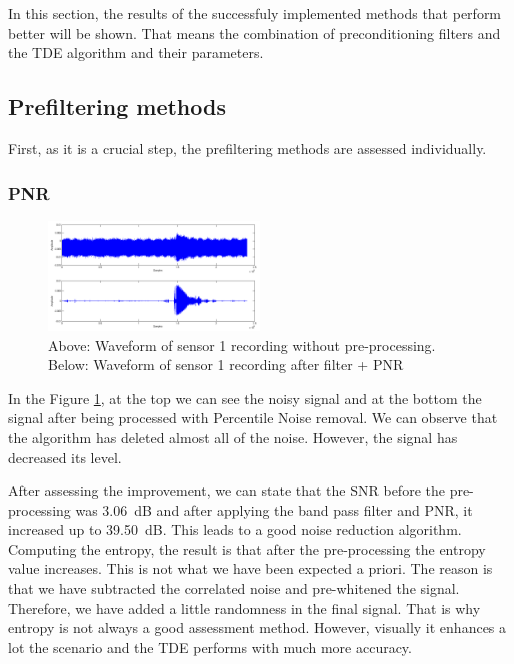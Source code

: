 In this section, the results of the successfuly implemented methods that perform better will be shown. That means the combination of preconditioning filters and the TDE algorithm and their parameters.

\subsection{Prefiltering methods}
First, as it is a crucial step, the prefiltering methods are assessed individually.

\subsubsection{PNR}

  \begin{figure}[htb]
	  \begin{center}
		  \includegraphics[width=0.5\textwidth]{figures/1PNR_waveform.png}
	  \end{center}
	  \caption{Above: Waveform of sensor 1 recording without pre-processing. Below: Waveform of sensor 1 recording after filter + PNR}
	  \label{fig:result_PNR_waveform}
  \end{figure}

  In the Figure \ref{fig:result_PNR_waveform}, at the top we can see the noisy signal and at the bottom the signal after being processed with Percentile Noise removal. We can observe that the algorithm has deleted almost all of the noise. However, the signal has decreased its level.

  After assessing the improvement, we can state that the SNR before the pre-processing was \SI{3.06}{\dB} and after applying the band pass filter and PNR, it increased up to \SI{39.50}{\dB}. This leads to a good noise reduction algorithm. Computing the entropy, the result is that after the pre-processing the entropy value increases. This is not what we have been expected a priori. The reason is that we have subtracted the correlated noise and pre-whitened the signal. Therefore, we have added a little randomness in the final signal. That is why entropy is not always a good assessment method. However, visually it enhances a lot the scenario and the TDE performs with much more accuracy.
  

